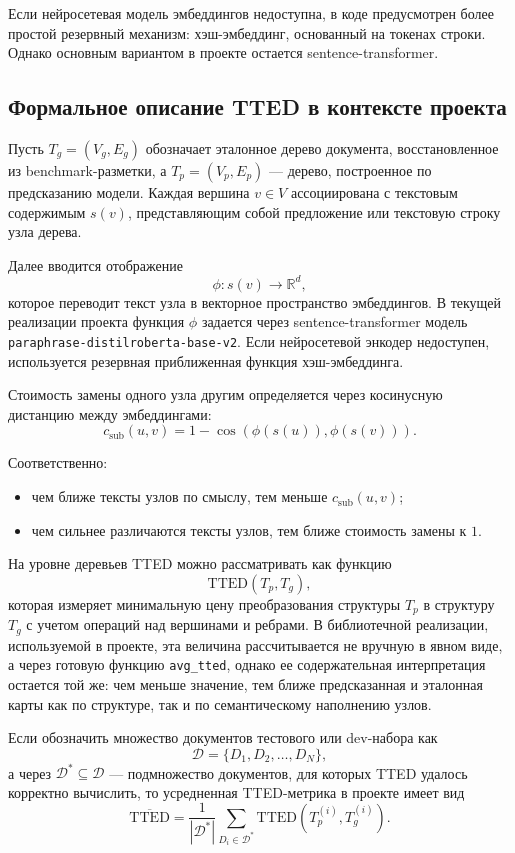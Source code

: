 \documentclass[12pt,a4paper]{article}
\begin{document}
Если нейросетевая модель эмбеддингов недоступна, в коде предусмотрен более простой
резервный механизм: хэш-эмбеддинг, основанный на токенах строки. Однако основным вариантом
в проекте остается sentence-transformer.

\subsection{Формальное описание TTED в контексте проекта}

Пусть $T_g = (V_g, E_g)$ обозначает эталонное дерево документа, восстановленное из
benchmark-разметки, а $T_p = (V_p, E_p)$ --- дерево, построенное по предсказанию модели.
Каждая вершина $v \in V$ ассоциирована с текстовым содержимым $s(v)$, представляющим
собой предложение или текстовую строку узла дерева.

Далее вводится отображение
\[
\phi: s(v) \rightarrow \mathbb{R}^d,
\]
которое переводит текст узла в векторное пространство эмбеддингов. В текущей реализации
проекта функция $\phi$ задается через sentence-transformer модель
\texttt{paraphrase-distilroberta-base-v2}. Если нейросетевой энкодер недоступен,
используется резервная приближенная функция хэш-эмбеддинга.

Стоимость замены одного узла другим определяется через косинусную дистанцию между
эмбеддингами:
\[
c_{\text{sub}}(u, v) = 1 - \cos(\phi(s(u)), \phi(s(v))).
\]

Соответственно:

\begin{itemize}
    \item чем ближе тексты узлов по смыслу, тем меньше $c_{\text{sub}}(u, v)$;
    \item чем сильнее различаются тексты узлов, тем ближе стоимость замены к $1$.
\end{itemize}

На уровне деревьев TTED можно рассматривать как функцию
\[
\mathrm{TTED}(T_p, T_g),
\]
которая измеряет минимальную цену преобразования структуры $T_p$ в структуру $T_g$ с
учетом операций над вершинами и ребрами. В библиотечной реализации, используемой в
проекте, эта величина рассчитывается не вручную в явном виде, а через готовую функцию
\texttt{avg\_tted}, однако ее содержательная интерпретация остается той же: чем меньше
значение, тем ближе предсказанная и эталонная карты как по структуре, так и по
семантическому наполнению узлов.

Если обозначить множество документов тестового или dev-набора как
\[
\mathcal{D} = \{D_1, D_2, \dots, D_N\},
\]
а через $\mathcal{D}^{*} \subseteq \mathcal{D}$ --- подмножество документов, для которых
TTED удалось корректно вычислить, то усредненная TTED-метрика в проекте имеет вид
\[
\overline{\mathrm{TTED}} = \frac{1}{|\mathcal{D}^{*}|}
\sum_{D_i \in \mathcal{D}^{*}} \mathrm{TTED}(T_p^{(i)}, T_g^{(i)}).
\]
\end{document}
